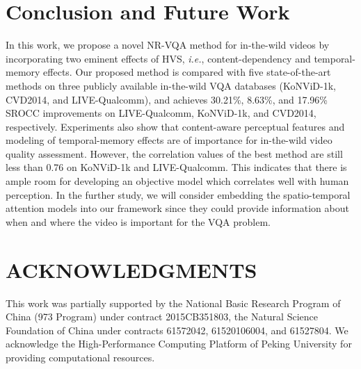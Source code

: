 \documentclass[sigconf]{acmart}
\begin{document}
\section{Conclusion and Future Work}
\label{sec:conclusion}
In this work, we propose a novel NR-VQA method for in-the-wild videos by incorporating two eminent effects of HVS, \textit{i.e.}, content-dependency and temporal-memory effects. 
Our proposed method is compared with five state-of-the-art methods on three publicly available in-the-wild VQA databases (KoNViD-1k, CVD2014, and LIVE-Qualcomm), and achieves 30.21\%, 8.63\%, and 17.96\% SROCC improvements on LIVE-Qualcomm, KoNViD-1k, and CVD2014, respectively.
Experiments also show that content-aware perceptual features and modeling of temporal-memory effects are of importance for in-the-wild video quality assessment.
However, the correlation values of the best method are still less than 0.76 on KoNViD-1k and LIVE-Qualcomm.
This indicates that there is ample room for developing an objective model which correlates well with human perception.
In the further study, we will consider embedding the spatio-temporal attention models into our framework since they could provide information about when and where the video is important for the VQA problem.

\section*{ACKNOWLEDGMENTS}
This work was partially supported by the National Basic Research Program of China (973 Program) under contract 2015CB351803, the Natural Science Foundation of China under contracts 61572042,  61520106004,  and 61527804. We acknowledge the High-Performance Computing Platform of Peking University for providing computational resources. 



\end{document}

